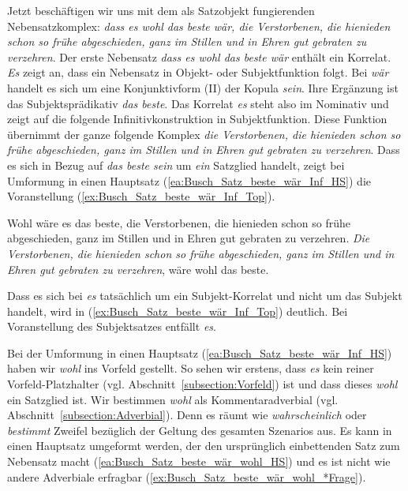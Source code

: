 Jetzt beschäftigen wir uns mit dem als Satzobjekt fungierenden Nebensatzkomplex: \textit{dass es wohl das beste wär, die Verstorbenen, die hienieden schon so frühe abgeschieden, ganz im Stillen und in Ehren gut gebraten zu verzehren}. Der erste Nebensatz \textit{dass es wohl das beste wär} enthält ein Korrelat. \textit{Es} zeigt an, dass ein Nebensatz in Objekt- oder Subjektfunktion folgt. Bei \textit{wär} handelt es sich um eine Konjunktivform (II) der Kopula \textit{sein}. Ihre Ergänzung ist das Subjektsprädikativ \textit{das beste}. Das Korrelat \textit{es} steht also im Nominativ und zeigt auf die folgende Infinitivkonstruktion in Subjektfunktion. Diese Funktion übernimmt der ganze folgende Komplex \textit{die Verstorbenen, die hienieden schon so frühe abgeschieden, ganz im Stillen und in Ehren gut gebraten zu verzehren}. Dass es sich in Bezug auf \textit{das beste sein} um \textit{ein} Satzglied handelt, zeigt bei Umformung in einen Hauptsatz (\ref{ea:Busch_Satz_beste_wär_Inf_HS}) die Voranstellung (\ref{ex:Busch_Satz_beste_wär_Inf_Top}).

\ea \label{ea:Busch_Satz_beste_wär_Inf}
\ea \label{ea:Busch_Satz_beste_wär_Inf_HS} Wohl wäre es das beste, die Verstorbenen, die hienieden schon so frühe abgeschieden, ganz im Stillen und in Ehren gut gebraten zu verzehren.
\ex \label{ex:Busch_Satz_beste_wär_Inf_Top} \textit{Die Verstorbenen, die hienieden schon so frühe abgeschieden, ganz im Stillen und in Ehren gut gebraten zu verzehren}, wäre wohl das beste.
\z 
\z 

Dass es sich bei \textit{es} tatsächlich um ein Subjekt-Korrelat und nicht um das Subjekt handelt, wird in (\ref{ex:Busch_Satz_beste_wär_Inf_Top}) deutlich. Bei Voranstellung des Subjektsatzes entfällt \textit{es}. 

Bei der Umformung in einen Hauptsatz (\ref{ea:Busch_Satz_beste_wär_Inf_HS}) haben wir \textit{wohl} ins Vorfeld gestellt. So sehen wir erstens, dass \textit{es} kein reiner Vorfeld-Platzhalter (vgl. Abschnitt~\ref{subsection:Vorfeld}) ist und dass dieses \textit{wohl} ein Satzglied ist. Wir bestimmen \textit{wohl} als Kommentaradverbial (vgl. Abschnitt~\ref{subsection:Adverbial}). Denn es räumt wie \textit{wahrscheinlich} oder \textit{bestimmt} Zweifel bezüglich der Geltung des gesamten Szenarios aus. Es kann in einen Hauptsatz umgeformt werden, der den ursprünglich einbettenden Satz zum Nebensatz macht (\ref{ea:Busch_Satz_beste_wär_wohl_HS}) und es ist nicht wie andere Adverbiale erfragbar (\ref{ex:Busch_Satz_beste_wär_wohl_*Frage}).



